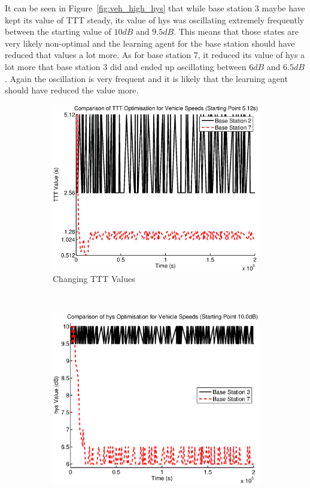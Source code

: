It can be seen in Figure~\ref{fig:veh_high_hys} that while base station 3 maybe have kept its value of TTT steady, its value of hys was oscillating extremely frequently between the starting value of $10 dB$ and $9.5 dB$. This means that those states are very likely non-optimal and the learning agent for the base station should have reduced that values a lot more. As for base station 7, it reduced its value of hys a lot more that base station 3 did and ended up oscillating between $6 dB$ and $6.5 dB$. Again the oscillation is very frequent and it is likely that the learning agent should have reduced the value more.
\begin{figure}[H]
        \centering
        \begin{subfigure}[b]{0.49\textwidth}
                \includegraphics[width=\textwidth]{figures/vehicle_figures/high/long_ttt.eps}
                \caption{Changing TTT Values}
                \label{fig:veh_high_ttt}
        \end{subfigure}%
        ~ %
        \begin{subfigure}[b]{0.49\textwidth}
                \includegraphics[width=\textwidth]{figures/vehicle_figures/high/long_hys.eps}

\end{subfigure}
\end{figure}
